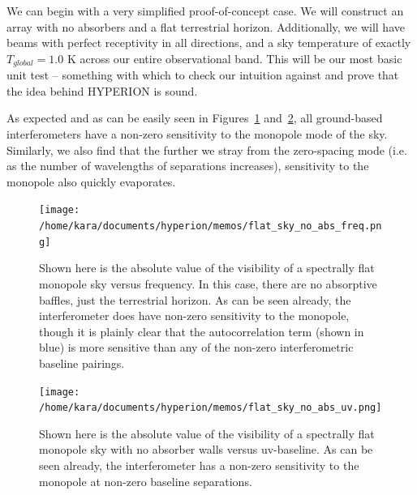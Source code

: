 We can begin with a very simplified proof-of-concept case. We will construct an 
array with no absorbers and a flat terrestrial horizon. Additionally, we will 
have beams with perfect receptivity in all directions, and a sky temperature of 
exactly $T_{global} = 1.0$ K across our entire observational band. This will be 
our most basic unit test -- something with which to check our intuition against 
and prove that the idea behind HYPERION is sound.

As expected and  as can be easily seen in 
Figures~\ref{fig:flat-sky-no-abs-freq} and~\ref{fig:flat-sky-no-abs-uv}, all 
ground-based interferometers have a non-zero sensitivity to the monopole mode 
of the sky. Similarly, we also find that the further we stray from the 
zero-spacing mode (i.e. as the number of wavelengths of separations increases), 
sensitivity to the monopole also quickly evaporates.

\begin{figure}
    \begin{center}
    \texttt{[image: /home/kara/documents/hyperion/memos/flat\_sky\_no\_abs\_freq.png]}
    \end{center}
    \caption{
        Shown here is the absolute value of the visibility of a spectrally flat 
        monopole sky versus frequency. In this case, there are no absorptive 
        baffles, just the terrestrial horizon. As can be seen already, the 
        interferometer does have non-zero sensitivity to the monopole, though 
        it is plainly clear that the autocorrelation term (shown in blue) is 
        more sensitive than any of the non-zero interferometric baseline 
        pairings.
    }
    \label{fig:flat-sky-no-abs-freq}
\end{figure}

\begin{figure}
    \begin{center}
    \texttt{[image: /home/kara/documents/hyperion/memos/flat\_sky\_no\_abs\_uv.png]}
    \end{center}
    \caption{
        Shown here is the absolute value of the visibility of a spectrally flat 
        monopole sky with no absorber walls versus uv-baseline. As can be seen 
        already, the interferometer has a non-zero sensitivity to the monopole 
        at non-zero baseline separations.
    }
    \label{fig:flat-sky-no-abs-uv}
\end{figure}

